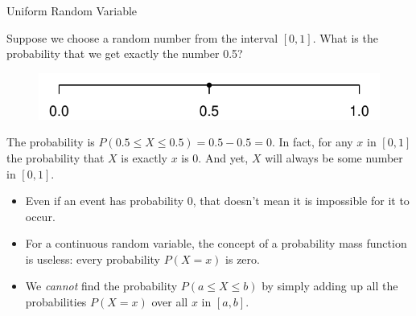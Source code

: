\documentclass[handout]{beamer}
\begin{document}
\begin{frame}{Uniform Random Variable}
\begin{block}{}
Suppose we choose a random number from the interval $[0,1]$. What is the probability that we get exactly the number 0.5?
\end{block}
\pause \begin{figure}[H]
\includegraphics{ch4_interval2.pdf}
\end{figure}
\pause
The probability is 
$P(0.5 \leq X \leq 0.5) = 0.5 - 0.5 = 0$. In fact, for any $x$ in $[0,1]$ the probability that $X$ is exactly $x$ is 0. And yet, $X$ will always be some number in $[0,1]$. %

\begin{itemize}
\pause \item Even if an event has probability 0, that doesn't mean it is impossible for it to occur.
\pause \item For a continuous random variable, the concept of a probability mass function is useless: every probability $P(X=x)$ is zero. 
\pause \item We \textit{cannot} find the probability $P(a \leq X \leq b)$ by simply adding up all the probabilities $P(X=x)$ over all $x$ in $[a,b]$.
\end{itemize}
\end{frame}
\end{document}
